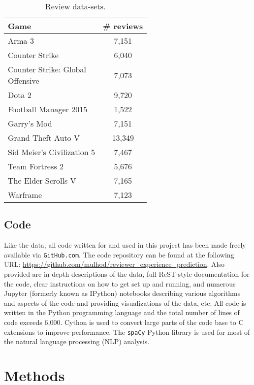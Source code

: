 \documentclass[9pt]{article}
\begin{document}
\begin{table}[ht]
\centering
\renewcommand{\arraystretch}{1.2}
\begin{tabular}{|l|c|}
\hline \bf Game & \bf \# reviews \\ \hline
Arma 3 & 7,151 \\
Counter Strike & 6,040 \\
\parbox[t]{4cm}{Counter Strike: Global\\Offensive} & 7,073 \\
Dota 2 & 9,720 \\
Football Manager 2015 & 1,522 \\
Garry's Mod & 7,151 \\
Grand Theft Auto V & 13,349 \\
Sid Meier's Civilization 5 & 7,467 \\
Team Fortress 2 & 5,676 \\
The Elder Scrolls V & 7,165 \\
Warframe & 7,123 \\ \hline
\end{tabular}
\caption{Review data-sets.}
\label{tab:datasets}
\end{table}

\subsection{Code}
\label{ssec:code}

Like the data, all code written for and used in this project has been made freely available via {\tt GitHub.com}. The code repository can be found at the following URL: \url{https://github.com/mulhod/reviewer_experience_prediction}. Also provided are in-depth descriptions of the data, full ReST-style documentation for the code, clear instructions on how to get set up and running, and numerous Jupyter (formerly known as IPython) notebooks describing various algorithms and aspects of the code and providing visualizations of the data, etc. All code is written in the Python programming language and the total number of lines of code exceeds 6,000. Cython is used to convert large parts of the code base to C extensions to improve performance. The {\tt spaCy} Python library is used for most of the natural language processing (NLP) analysis.

\section{Methods}
\label{sec:methods}
\end{document}
